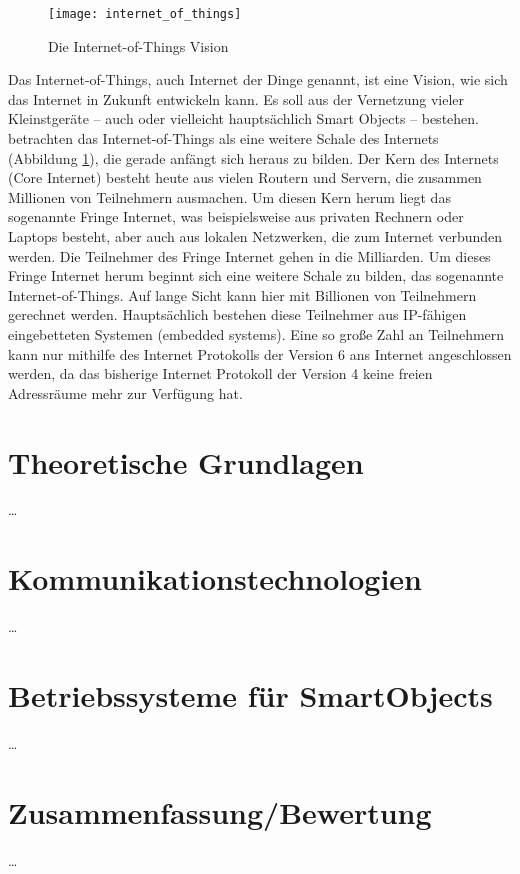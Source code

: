 \begin{figure}[htbp]
	\centering
	\texttt{[image: internet\_of\_things]}
	\caption{Die Internet-of-Things Vision \cite[Figure 1.2]{Bormann:6LoWPAN}}
	\label{fig:internet_of_things}
\end{figure}

Das Internet-of-Things, auch Internet der Dinge genannt, ist eine Vision, wie sich das Internet in Zukunft entwickeln kann. Es soll aus der Vernetzung vieler Kleinstgeräte -- auch oder vielleicht hauptsächlich Smart Objects -- bestehen. \textcite{Bormann:6LoWPAN} betrachten das Internet-of-Things als eine weitere Schale des Internets (Abbildung \ref{fig:internet_of_things}), die gerade anfängt sich heraus zu bilden. Der Kern des Internets (Core Internet) besteht heute aus vielen Routern und Servern, die zusammen Millionen von Teilnehmern ausmachen. Um diesen Kern herum liegt das sogenannte Fringe Internet, was beispielsweise aus privaten Rechnern oder Laptops besteht, aber auch aus lokalen Netzwerken, die zum Internet verbunden werden. Die Teilnehmer des Fringe Internet gehen in die Milliarden. Um dieses Fringe Internet herum beginnt sich eine weitere Schale zu bilden, das sogenannte Internet-of-Things. Auf lange Sicht kann hier mit Billionen von Teilnehmern gerechnet werden. Hauptsächlich bestehen diese Teilnehmer aus IP-fähigen eingebetteten Systemen (embedded systems). Eine so große Zahl an Teilnehmern kann nur mithilfe des Internet Protokolls der Version 6 ans Internet angeschlossen werden, da das bisherige Internet Protokoll der Version 4 keine freien Adressräume mehr zur Verfügung hat.

\section{Theoretische Grundlagen}
\ldots
\section{Kommunikationstechnologien}
\ldots
\section{Betriebssysteme für SmartObjects}
\ldots
\section{Zusammenfassung/Bewertung}
\ldots